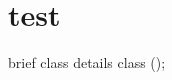 \hypertarget{test-example}{}\section{test}
brief class details class ();


\begin{DoxyCodeInclude}
\end{DoxyCodeInclude}
 